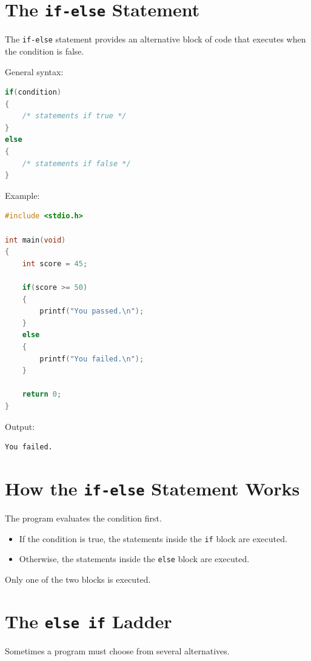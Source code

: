 \documentclass[12pt,openany]{book}
\begin{document}
\section{The \texttt{if-else} Statement}

The \texttt{if-else} statement provides an alternative block of code that executes when the condition is false.

General syntax:

\begin{lstlisting}[language=C]
if(condition)
{
    /* statements if true */
}
else
{
    /* statements if false */
}
\end{lstlisting}

Example:

\begin{lstlisting}[language=C]
#include <stdio.h>

int main(void)
{
    int score = 45;

    if(score >= 50)
    {
        printf("You passed.\n");
    }
    else
    {
        printf("You failed.\n");
    }

    return 0;
}
\end{lstlisting}

Output:

\begin{lstlisting}
You failed.
\end{lstlisting}

\section{How the \texttt{if-else} Statement Works}

The program evaluates the condition first.

\begin{itemize}
    \item If the condition is true, the statements inside the \texttt{if} block are executed.
    \item Otherwise, the statements inside the \texttt{else} block are executed.
\end{itemize}

Only one of the two blocks is executed.

\section{The \texttt{else if} Ladder}

Sometimes a program must choose from several alternatives.
\end{document}
